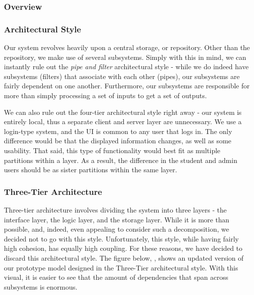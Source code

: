 \documentclass[12pt,letterpaper]{article}
\begin{document}
\subsubsection{Overview}

\subsubsection{Architectural Style}

Our system revolves heavily upon a central storage, or repository. Other than the repository, we make use of several subsystems. Simply with this in mind, we can instantly rule out the {\it pipe and filter} architectural style - while we do indeed have subsystems (filters) that associate with each other (pipes), our subsystems are fairly dependent on one another. Furthermore, our subsystems are responsible for more than simply processing a set of inputs to get a set of outputs. 

We can also rule out the four-tier architectural style right away - our system is entirely local, thus a separate client and server layer are unnecessary. We use a login-type system, and the UI is common to any user that logs in. The only difference would be that the displayed information changes, as well as some usability. That said, this type of functionality would best fit as multiple partitions within a layer. As a result, the difference in the student and admin users should be as sister partitions within the same layer.

\subsubsection*{Three-Tier Architecture}

Three-tier architecture involves dividing the system into three layers - the interface layer, the logic layer, and the storage layer. While it is more than possible, and, indeed, even appealing to consider such a decomposition, we decided not to go with this style. Unfortunately, this style, while having fairly high cohesion, has equally high coupling. For these reasons, we have decided to discard this architectural style. The figure below, , shows an updated version of our prototype model designed in the Three-Tier architectural style. With this visual, it is easier to see that the amount of dependencies that span across subsystems is enormous.
\end{document}
